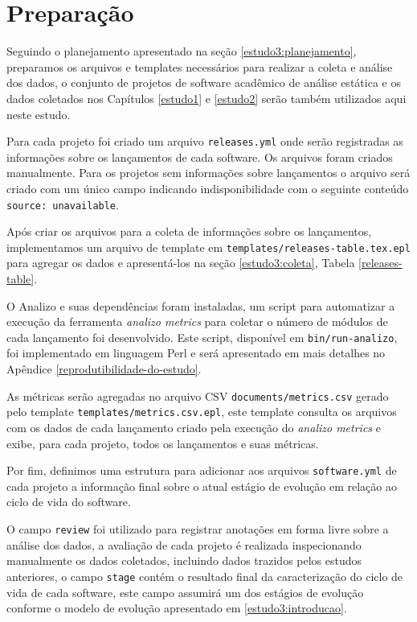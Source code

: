 
\section{Preparação} \label{estudo3:preparacao} %

Seguindo o planejamento apresentado na seção \ref{estudo3:planejamento},
preparamos os arquivos e templates necessários para realizar a coleta e análise
dos dados, o conjunto de projetos de software acadêmico de análise estática e
os dados coletados nos Capítulos \ref{estudo1} e \ref{estudo2} serão também
utilizados aqui neste estudo.

Para cada projeto foi criado um arquivo \texttt{releases.yml}
onde serão registradas as
informações sobre os lançamentos de cada software. Os arquivos foram criados
manualmente. Para os projetos sem informações sobre lançamentos o arquivo será
criado com um único campo indicando indisponibilidade com o seguinte conteúdo
\texttt{source: unavailable}.

Após criar os arquivos para a coleta de informações sobre os lançamentos,
implementamos um arquivo de template em
\texttt{templates/releases-table.tex.epl} para agregar os dados e apresentá-los
na seção \ref{estudo3:coleta}, Tabela \ref{releases-table}.

O Analizo e suas dependências foram instaladas, um script para automatizar a
execução da ferramenta {\it analizo metrics} para coletar o número de módulos
de cada lançamento foi desenvolvido. Este script, disponível em
\texttt{bin/run-analizo}, foi implementado em linguagem Perl e será apresentado
em mais detalhes no Apêndice \ref{reprodutibilidade-do-estudo}.

As métricas serão agregadas no arquivo CSV \texttt{documents/metrics.csv}
gerado pelo template \texttt{templates/metrics.csv.epl}, este template consulta
os arquivos com os dados de cada lançamento criado pela execução do {\it analizo metrics}
e exibe, para cada projeto, todos os lançamentos e suas métricas.

Por fim, definimos uma estrutura para adicionar aos arquivos \texttt{software.yml} de
cada projeto a informação final sobre o atual estágio de evolução em relação ao
ciclo de vida do software.

O campo \texttt{review} foi utilizado para registrar anotações em forma livre
sobre a análise dos dados, a avaliação de cada projeto é realizada
inspecionando manualmente os dados coletados, incluindo dados trazidos pelos
estudos anteriores, o campo \texttt{stage} contém o resultado final da
caracterização do ciclo de vida de cada software, este campo assumirá um dos
estágios de evolução conforme o modelo de evolução apresentado em
\ref{estudo3:introducao}.

